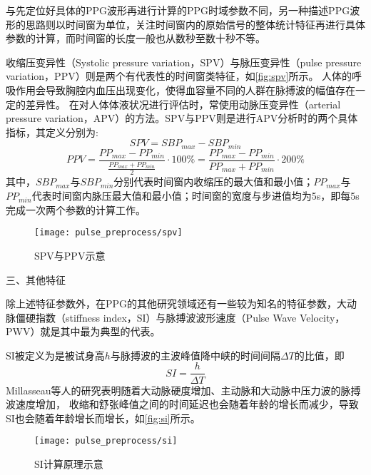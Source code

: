 与先定位好具体的PPG波形再进行计算的PPG时域参数不同，另一种描述PPG波形的思路则以时间窗为单位，关注时间窗内的原始信号的整体统计特征再进行具体参数的计算，而时间窗的长度一般也从数秒至数十秒不等。

收缩压变异性（Systolic pressure variation，SPV）与脉压变异性（pulse pressure variation，PPV）则是两个有代表性的时间窗类特征，如\autoref{fig:spv}所示\cite{GE2021,Michard1999,Perel1987,Michard2005}。
人体的呼吸作用会导致胸腔内血压出现变化，使得血容量不同的人群在脉搏波的幅值存在一定的差异性。
在对人体体液状况进行评估时，常使用动脉压变异性（arterial pressure variation，APV）的方法。SPV与PPV则是进行APV分析时的两个具体指标，其定义分别为\cite{GE2021}:
\begin{equation}
    \label{equ:spv}
    SPV=SBP_{max}-SBP_{min}
\end{equation}
\begin{equation}
    \label{equ:ppv}
    PPV=\frac{PP_{max}-PP_{min}}{\frac{PP_{max}+PP_{min}}{2}}\cdot 100\%=\frac{PP_{max}-PP_{min}}{PP_{max}+PP_{min}}\cdot 200\%
\end{equation}
其中，$SBP_{max}$与$SBP_{min}$分别代表时间窗内收缩压的最大值和最小值；$PP_{max}$与$PP_{min}$代表时间窗内脉压最大值和最小值；时间窗的宽度与步进值均为5s，即每5s完成一次两个参数的计算工作。
\begin{figure}[htbp]
    \centering
    \texttt{[image: pulse\_preprocess/spv]}
    \caption{\label{fig:spv}SPV与PPV示意}
\end{figure}

三、其他特征

除上述特征参数外，在PPG的其他研究领域还有一些较为知名的特征参数，大动脉僵硬指数（stiffness index，SI）与脉搏波波形速度（Pulse Wave Velocity，PWV）就是其中最为典型的代表。

SI被定义为是被试身高$h$与脉搏波的主波峰值降中峡的时间间隔$\Delta T$的比值\cite{Elgendi2012,Millasseau2002,Brumfield2005}，即
\begin{equation}
    \label{equ:si}
    SI = \frac{h}{\Delta T}
\end{equation}
Millasseau等人的研究表明随着大动脉硬度增加、主动脉和大动脉中压力波的脉搏波速度增加，
收缩和舒张峰值之间的时间延迟也会随着年龄的增长而减少，导致SI也会随着年龄增长而增长，如\autoref{fig:si}所示\cite{Elgendi2012,Millasseau2002,Brumfield2005}。
\begin{figure}[htbp]
    \centering
    \texttt{[image: pulse\_preprocess/si]}
    \caption[SI计算原理示意]{\label{fig:si}SI计算原理示意\cite{Elgendi2012,Millasseau2002,Brumfield2005}}
\end{figure}

